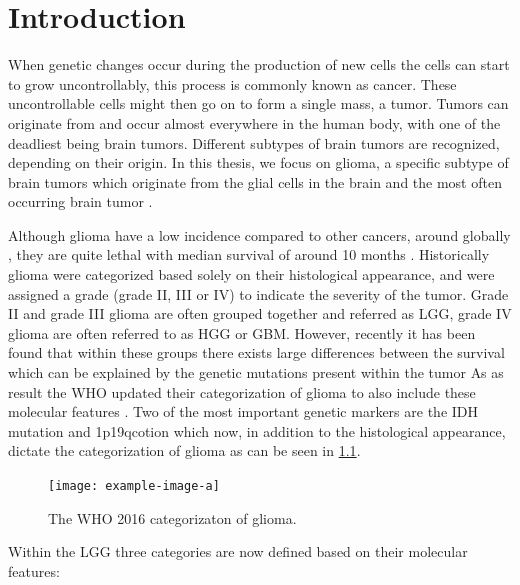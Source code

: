 
\chapter{Introduction}

When genetic changes occur during the production of new cells the cells can start to grow uncontrollably, this process is commonly known as cancer.
These uncontrollable cells might then go on to form a single mass, a tumor.
Tumors can originate from and occur almost everywhere in the human body, with one of the deadliest being brain tumors.
Different subtypes of brain tumors are recognized, depending on their origin.
In this thesis, we focus on glioma, a specific subtype of brain tumors which originate from the glial cells in the brain and the most often occurring brain tumor \autocite{leece2017indicence}.

Although glioma have a low incidence compared to other cancers, around  globally \autocite{leece2017indicence}, they are quite lethal with median survival of around 10 months \autocite{hess2004gliomaincidence}.
Historically glioma were categorized based solely on their histological appearance, and were assigned a grade (grade II, III or IV) to indicate the severity of the tumor.
Grade II and grade III glioma are often grouped together and referred as \gls{LGG}, grade IV glioma are often referred to as \gls{HGG} or \gls{GBM}.
However, recently it has been found that within these groups there exists large differences between the survival which can be explained by the genetic mutations present within the tumor \autocite{eckel2015gliomagroups}
As as result the \gls{WHO} updated their categorization of glioma to also include these molecular features \cite{louis20162016}.
Two of the most important genetic markers are the \gls{IDH} mutation and \acl{1p19qcotion} which now, in addition to the histological appearance, dictate the categorization of glioma as can be seen in \cref{fig:intro_glioma_categorization}.

\begin{figure}[hbt]
    \centering
    \texttt{[image: example-image-a]}
    \caption{The WHO 2016 categorizaton of glioma.}\label{fig:intro_glioma_categorization}
\end{figure}

Within the \gls{LGG} three categories are now defined based on their molecular features:

